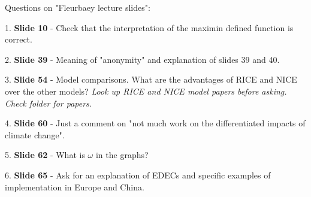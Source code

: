 \documentclass{article}
\begin{document}
Questions on "Fleurbaey lecture slides":

1. \textbf{Slide 10} - Check that the interpretation of the maximin defined function is correct.

2. \textbf{Slide 39} - Meaning of "anonymity" and explanation of slides 39 and 40.

3. \textbf{Slide 54} - Model comparisons. What are the advantages of RICE and NICE over the other models?
\newline \emph{Look up RICE and NICE model papers before asking. Check folder for papers.}

4. \textbf{Slide 60} - Just a comment on "not much work on the differentiated impacts of climate change".

5. \textbf{Slide 62} - What is $\omega$ in the graphs?

6. \textbf{Slide 65} - Ask for an explanation of EDECs and specific examples of implementation in Europe and China.
\end{document}
